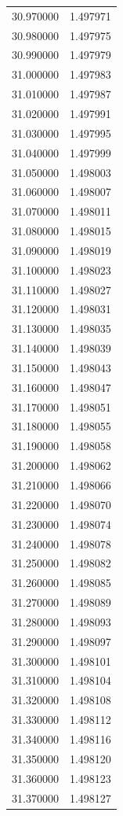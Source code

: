 \begin{tabular}{rr}
30.970000 & 1.497971 \\
30.980000 & 1.497975 \\
30.990000 & 1.497979 \\
31.000000 & 1.497983 \\
31.010000 & 1.497987 \\
31.020000 & 1.497991 \\
31.030000 & 1.497995 \\
31.040000 & 1.497999 \\
31.050000 & 1.498003 \\
31.060000 & 1.498007 \\
31.070000 & 1.498011 \\
31.080000 & 1.498015 \\
31.090000 & 1.498019 \\
31.100000 & 1.498023 \\
31.110000 & 1.498027 \\
31.120000 & 1.498031 \\
31.130000 & 1.498035 \\
31.140000 & 1.498039 \\
31.150000 & 1.498043 \\
31.160000 & 1.498047 \\
31.170000 & 1.498051 \\
31.180000 & 1.498055 \\
31.190000 & 1.498058 \\
31.200000 & 1.498062 \\
31.210000 & 1.498066 \\
31.220000 & 1.498070 \\
31.230000 & 1.498074 \\
31.240000 & 1.498078 \\
31.250000 & 1.498082 \\
31.260000 & 1.498085 \\
31.270000 & 1.498089 \\
31.280000 & 1.498093 \\
31.290000 & 1.498097 \\
31.300000 & 1.498101 \\
31.310000 & 1.498104 \\
31.320000 & 1.498108 \\
31.330000 & 1.498112 \\
31.340000 & 1.498116 \\
31.350000 & 1.498120 \\
31.360000 & 1.498123 \\
31.370000 & 1.498127 \\

\end{tabular}
